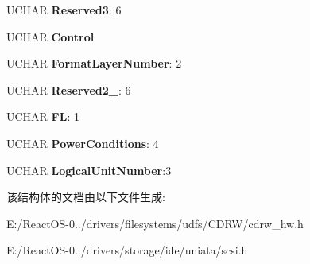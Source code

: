 \begin{DoxyCompactItemize}
\mbox{\label{struct___c_d_b_1_1___s_t_a_r_t___s_t_o_p_aaca3b92fea304c6e5c1549cbbd0bff57}} 
U\+C\+H\+AR {\bfseries Reserved3}\+: 6
\item 
\mbox{\label{struct___c_d_b_1_1___s_t_a_r_t___s_t_o_p_af4732e54fe12cad1f0b85813a57434b0}} 
U\+C\+H\+AR {\bfseries Control}
\item 
\mbox{\label{struct___c_d_b_1_1___s_t_a_r_t___s_t_o_p_a0689d708037251a517ad3693e64fbe00}} 
U\+C\+H\+AR {\bfseries Format\+Layer\+Number}\+: 2
\item 
\mbox{\label{struct___c_d_b_1_1___s_t_a_r_t___s_t_o_p_a5ae3293b6e1657f3dab1d9e58536d060}} 
U\+C\+H\+AR {\bfseries Reserved2\+\_}\+: 6
\item 
\mbox{\label{struct___c_d_b_1_1___s_t_a_r_t___s_t_o_p_a7206b9c85ebf29b5c794cce97b0ad41d}} 
U\+C\+H\+AR {\bfseries FL}\+: 1
\item 
\mbox{\label{struct___c_d_b_1_1___s_t_a_r_t___s_t_o_p_a5588332cfd8ac804b9165234e3d6ed39}} 
U\+C\+H\+AR {\bfseries Power\+Conditions}\+: 4
\item 
\mbox{\label{struct___c_d_b_1_1___s_t_a_r_t___s_t_o_p_aa57f3bbc55fab94b25d559b7435eda70}} 
U\+C\+H\+AR {\bfseries Logical\+Unit\+Number}\+:3
\end{DoxyCompactItemize}


该结构体的文档由以下文件生成\+:\begin{DoxyCompactItemize}
\item 
E\+:/\+React\+O\+S-\/0../drivers/filesystems/udfs/\+C\+D\+R\+W/cdrw\+\_\+hw.\+h\item 
E\+:/\+React\+O\+S-\/0../drivers/storage/ide/uniata/scsi.\+h\end{DoxyCompactItemize}
